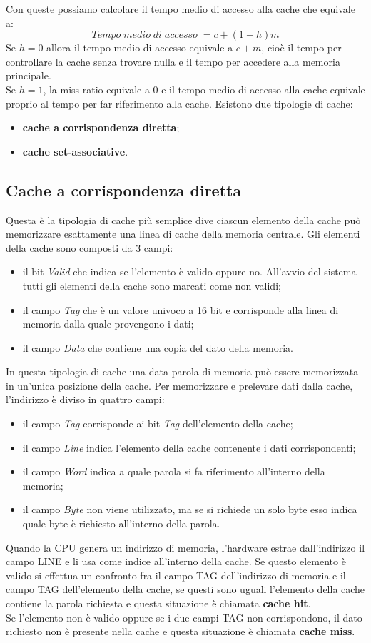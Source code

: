 \documentclass[12pt]{report}
\begin{document}
Con queste possiamo calcolare il tempo medio di accesso alla cache che equivale a:
\[
Tempo \; medio \; di \; accesso \; = c + (1-h)m
\]
Se $h = 0$ allora il tempo medio di accesso equivale a $c + m$, cioè il tempo per controllare la cache senza trovare nulla e il tempo per accedere alla memoria principale. \\
Se $h = 1$, la miss ratio equivale a 0 e il tempo medio di accesso alla cache equivale proprio al tempo per far riferimento alla cache.
Esistono due tipologie di cache:
\begin{itemize}
	\item \textbf{cache a corrispondenza diretta};
	\item \textbf{cache set-associative}.
\end{itemize}
\subsection{Cache a corrispondenza diretta}
Questa è la tipologia di cache più semplice dive ciascun elemento della cache può memorizzare esattamente una linea di cache della memoria centrale. Gli elementi della cache sono composti da 3 campi:
\begin{itemize}
	\item il bit \textit{Valid} che indica se l'elemento è valido oppure no. All'avvio del sistema tutti gli elementi della cache sono marcati come non validi;
	\item il campo \textit{Tag} che è un valore univoco a 16 bit e corrisponde alla linea di memoria dalla quale provengono i dati;
	\item il campo \textit{Data} che contiene una copia del dato della memoria.
\end{itemize}
In questa tipologia di cache una data parola di memoria può essere memorizzata in un'unica posizione della cache. Per memorizzare e prelevare dati dalla cache, l'indirizzo è diviso in quattro campi:
\begin{itemize}
	\item il campo \textit{Tag} corrisponde ai bit \textit{Tag} dell'elemento della cache;
	\item il campo \textit{Line} indica l'elemento della cache contenente i dati corrispondenti;
	\item il campo \textit{Word} indica a quale parola si fa riferimento all'interno della memoria;
	\item il campo \textit{Byte} non viene utilizzato, ma se si richiede un solo byte esso indica quale byte è richiesto all'interno della parola.
\end{itemize}
Quando la CPU genera un indirizzo di memoria, l'hardware estrae dall'indirizzo il campo LINE e li usa come indice all'interno della cache. Se questo elemento è valido si effettua un confronto fra il campo TAG dell'indirizzo di memoria e il campo TAG dell'elemento della cache, se questi sono uguali l'elemento della cache contiene la parola richiesta e questa situazione è chiamata \textbf{cache hit}. \\
Se l'elemento non è valido oppure se i due campi TAG non corrispondono, il dato richiesto non è presente nella cache e questa situazione è chiamata \textbf{cache miss}.
\end{document}
